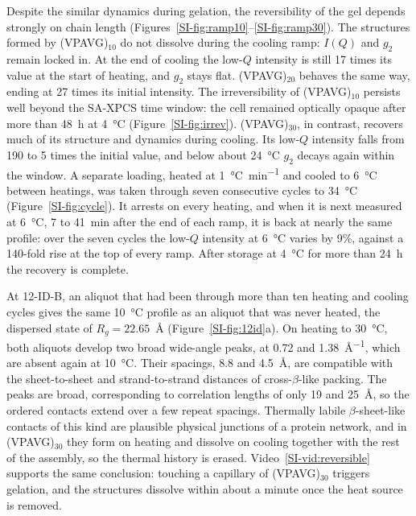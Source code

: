\documentclass[journal=nalefd,manuscript=letter,layout=traditional]{achemso}
\newcommand{\VP}[1]{(VPAVG)$_{#1}$}
\begin{document}
Despite the similar dynamics during gelation, the reversibility of the gel depends strongly on chain length (Figures~\ref{SI-fig:ramp10}--\ref{SI-fig:ramp30}). The structures formed by \VP{10} do not dissolve during the cooling ramp: $I(Q)$ and $g_2$ remain locked in. At the end of cooling the low-$Q$ intensity is still 17 times its value at the start of heating, and $g_2$ stays flat. \VP{20} behaves the same way, ending at 27 times its initial intensity. The irreversibility of \VP{10} persists well beyond the SA-XPCS time window: the cell remained optically opaque after more than \SI{48}{\hour} at \SI{4}{\degreeCelsius} (Figure~\ref{SI-fig:irrev}). \VP{30}, in contrast, recovers much of its structure and dynamics during cooling. Its low-$Q$ intensity falls from 190 to 5 times the initial value, and below about \SI{24}{\degreeCelsius} $g_2$ decays again within the window. A separate loading, heated at \SI{1}{\degreeCelsius\per\minute} and cooled to \SI{6}{\degreeCelsius} between heatings, was taken through seven consecutive cycles to \SI{34}{\degreeCelsius} (Figure~\ref{SI-fig:cycle}). It arrests on every heating, and when it is next measured at \SI{6}{\degreeCelsius}, 7 to \SI{41}{\minute} after the end of each ramp, it is back at nearly the same profile: over the seven cycles the low-$Q$ intensity at \SI{6}{\degreeCelsius} varies by 9\%, against a 140-fold rise at the top of every ramp. After storage at \SI{4}{\degreeCelsius} for more than \SI{24}{\hour} the recovery is complete.

At 12-ID-B, an aliquot that had been through more than ten heating and cooling cycles gives the same \SI{10}{\degreeCelsius} profile as an aliquot that was never heated, the dispersed state of $R_g=22.65$~\AA{} (Figure~\ref{SI-fig:12id}a). On heating to \SI{30}{\degreeCelsius}, both aliquots develop two broad wide-angle peaks, at 0.72 and \SI{1.38}{\angstrom^{-1}}, which are absent again at \SI{10}{\degreeCelsius}. Their spacings, 8.8 and \SI{4.5}{\angstrom}, are compatible with the sheet-to-sheet and strand-to-strand distances of cross-$\beta$-like packing.\cite{Sunde1997-jmb,Sawaya2007-nature} The peaks are broad, corresponding to correlation lengths of only 19 and \SI{25}{\angstrom}, so the ordered contacts extend over a few repeat spacings. Thermally labile $\beta$-sheet-like contacts of this kind are plausible physical junctions of a protein network,\cite{Kato2012-cell,Hughes2018-science,Luo2018-nsmb} and in \VP{30} they form on heating and dissolve on cooling together with the rest of the assembly, so the thermal history is erased. Video~\ref{SI-vid:reversible} supports the same conclusion: touching a capillary of \VP{30} triggers gelation, and the structures dissolve within about a minute once the heat source is removed.
\end{document}
